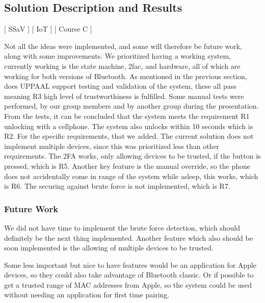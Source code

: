 \subsection{Solution Description and Results}\label{sec:SolutionDescriptionAndResults}
[ SSaV ] [ IoT ] [ Course C ] 
\newline
[ Casper ] [ Phu ] [ Simon ] 
\newline
\begin{comment}
The solution provides the functionality of connecting with bluetooth to the ESP, if the bluetooth connection is recognized as a trusted device, it will allow the user to enter. While it is also possible to open up the door with the potentiometer in case that the bluetooth is unable to connect, the idea is that malfunctions could happen and the user would still need access to their house and or belongings. If it were the case that non of the intended methods to gain entry is used, the bluetooth connection and potentiometer, an alarm will be set of as it would then be considered a forced entry.
\end{comment}

Not all the ideas were implemented, and some will therefore be future work, along with some improvements.
We prioritized having a working system, currently working is the state machine, 2fac, and hardware, all of which are working for both versions of Bluetooth.
As mentioned in the previous section, does UPPAAL support testing and validation of the system, these all pass meaning R3 high level of trustworthiness is fulfilled.
Some manual tests were performed, by our group members and by another group during the presentation.
From the tests, it can be concluded that the system meets the requirement R1 unlocking with a cellphone.
The system also unlocks within 10 seconds which is R2.
For the specific requirements, that we added.
The current solution does not implement multiple devices, since this was prioritized less than other requirements.
The 2FA works, only allowing devices to be trusted, if the button is pressed, which is R5.
Another key feature is the manual override, so the phone does not accidentally come in range of the system while asleep, this works, which is R6.
The securing against brute force is not implemented, which is R7.

\subsubsection{Future Work}\label{sec:FutureWork}
We did not have time to implement the brute force detection, which should definitely be the next thing implemented. Another feature which also should be soon implemented is the allowing of multiple devices to be trusted.

Some less important but nice to have features would be an application for Apple devices, so they could also take advantage of Bluetooth classic.
Or if possible to get a trusted range of MAC addresses from Apple, so the system could be used without needing an application for first time pairing.
